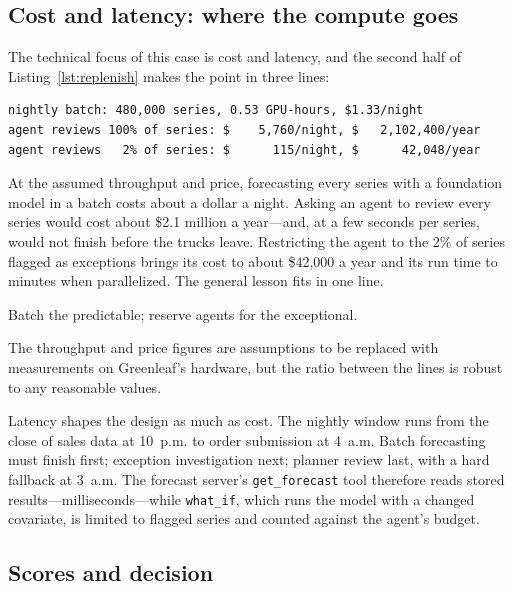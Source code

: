 \subsection{Cost and latency: where the compute goes}

The technical focus of this case is cost and latency, and the second half of Listing~\ref{lst:replenish} makes the point in three lines:
\begin{lstlisting}[language={}, numbers=none, frame=none, xleftmargin=1.5em]
nightly batch: 480,000 series, 0.53 GPU-hours, $1.33/night
agent reviews 100% of series: $    5,760/night, $   2,102,400/year
agent reviews   2% of series: $      115/night, $      42,048/year
\end{lstlisting}

At the assumed throughput and price, forecasting every series with a foundation model in a batch costs about a dollar a night. Asking an agent to review every series would cost about \$2.1 million a year---and, at a few seconds per series, would not finish before the trucks leave. Restricting the agent to the 2\% of series flagged as exceptions brings its cost to about \$42{,}000 a year and its run time to minutes when parallelized. The general lesson fits in one line.

\begin{keyidea}
Batch the predictable; reserve agents for the exceptional.
\end{keyidea}

 The throughput and price figures are assumptions to be replaced with measurements on Greenleaf's hardware, but the ratio between the lines is robust to any reasonable values.

Latency shapes the design as much as cost. The nightly window runs from the close of sales data at 10~p.m. to order submission at 4~a.m. Batch forecasting must finish first; exception investigation next; planner review last, with a hard fallback at 3~a.m. The forecast server's \texttt{get\_forecast} tool therefore reads stored results---milliseconds---while \texttt{what\_if}, which runs the model with a changed covariate, is limited to flagged series and counted against the agent's budget.

\subsection{Scores and decision}

